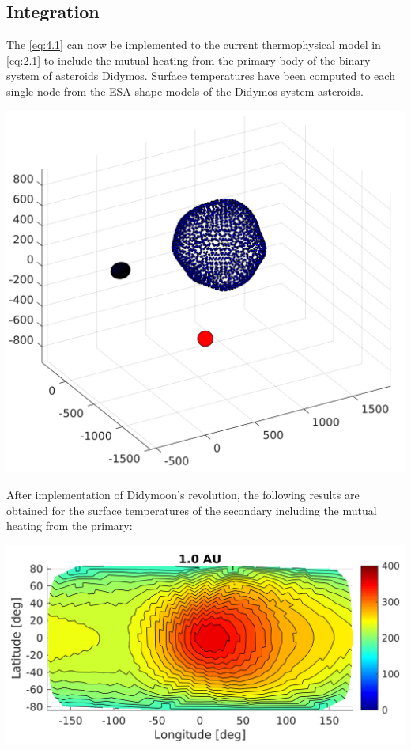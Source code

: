 \subsection{Integration}
The \autoref{eq:4.1} can now be implemented to the current thermophysical model in \autoref{eq:2.1} to include the mutual heating from the primary body of the binary system of asteroids Didymos. Surface temperatures have been computed to each single node from the ESA shape models of the Didymos system asteroids.
\begin{center}
    \includegraphics[width=0.9\linewidth]{rsc/mutual_model.png}
    \label{fig:4.2}
\end{center}
After implementation of Didymoon's revolution, the following results are obtained for the surface temperatures of the secondary including the mutual heating from the primary:
\begin{center}
    \includegraphics[width=\linewidth]{rsc/mutual.png}
    \label{fig:4.3}
\end{center}
